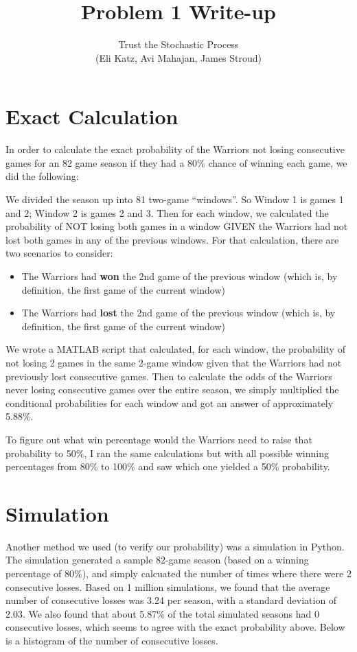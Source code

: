 \documentclass[12pt]{article}
\theoremstyle{nonumberplain}
\begin{document}
 
 
\title{Problem 1 Write-up}%
\author{Trust the Stochastic Process\\
        (Eli Katz, Avi Mahajan, James Stroud)}
 
\maketitle

\section{Exact Calculation}
 In order to calculate the exact probability of the Warriors not losing consecutive games for an 82 game season if they had a 80\% chance of winning each game, we did the following:

We divided the season up into 81 two-game ``windows''. So Window 1 is
games 1 and 2; Window 2 is games 2 and 3. Then for each window, we calculated the probability of NOT losing both games in a window GIVEN the Warriors had not lost both games in any of the previous windows. For that calculation, there are two scenarios to consider:
\begin{itemize}
\item The Warriors had \textbf{won} the 2nd game of the previous window (which is, by definition, the first game of the current window)
\item The Warriors had \textbf{lost} the 2nd game of the previous window (which is, by definition, the first game of the current window)
\end{itemize}
We wrote a MATLAB script that calculated, for each window, the probability of not losing 2 games in the same 2-game window given that the Warriors had not previously lost consecutive games. Then to calculate the odds of the Warriors never losing consecutive games over the entire season, we simply multiplied the conditional probabilities for each window and got an answer of approximately 5.88\%.

To figure out what win percentage would the Warriors need to raise that probability to 50\%, I ran the same calculations but with all possible winning percentages from 80\% to 100\% and saw which one yielded a 50\% probability.


\section{Simulation}
Another method we used (to verify our probability) was a simulation in Python. The simulation generated a sample 82-game season (based on a winning percentage of 80\%), and simply calcuated the number of times where there were 2 consecutive losses. Based on 1 million simulations, we found that the average number of consecutive losses was 3.24 per season, with a standard deviation of 2.03. We also found that about 5.87\% of the total simulated seasons had 0 consecutive losses, which seems to agree with the exact probability above. Below is a histogram of the number of consecutive losses.
\end{document}
